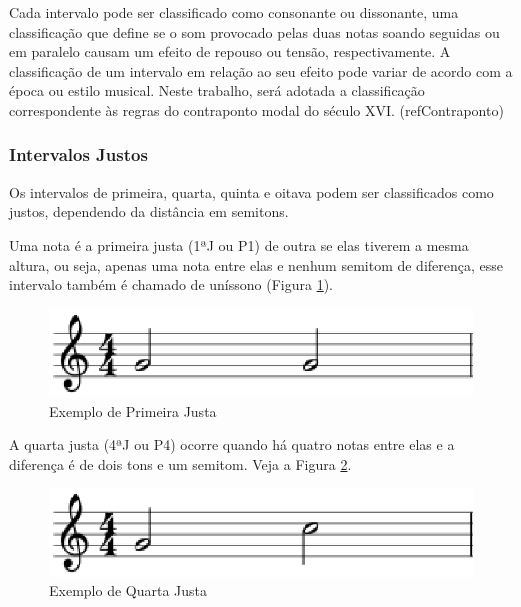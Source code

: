       Cada intervalo pode ser classificado como consonante ou dissonante, uma classificação que define se o som provocado pelas duas notas soando seguidas ou em paralelo causam um efeito de repouso ou tensão, respectivamente. A classificação de um intervalo em relação ao seu efeito pode variar de acordo com a época ou estilo musical. Neste trabalho, será adotada a classificação correspondente às regras do contraponto modal do século XVI. (refContraponto)

      \subsubsection[Intervalos Justos]{Intervalos Justos}

        Os intervalos de primeira, quarta, quinta e oitava podem ser classificados como justos, dependendo da distância em semitons.

        Uma nota é a primeira justa (1ªJ ou P1\footnotemark {}) de outra se elas tiverem a mesma altura, ou seja, apenas uma nota entre elas e nenhum semitom de diferença, esse intervalo também é chamado de uníssono (Figura \ref{primeirajusta}).

        \begin{figure}[htb]
          \centering
          \includegraphics[scale=0.6]{figuras/primeirajusta.eps}
          \caption{Exemplo de Primeira Justa}
          \label{primeirajusta}
        \end{figure}


        A quarta justa (4ªJ ou P4) ocorre quando há quatro notas entre elas e a diferença é de dois tons e um semitom. Veja a Figura \ref{quartajusta}.

        \begin{figure}[htb]
          \centering
          \includegraphics[scale=0.6]{figuras/quartajusta.eps}
          \caption{Exemplo de Quarta Justa}
          \label{quartajusta}
        \end{figure}

